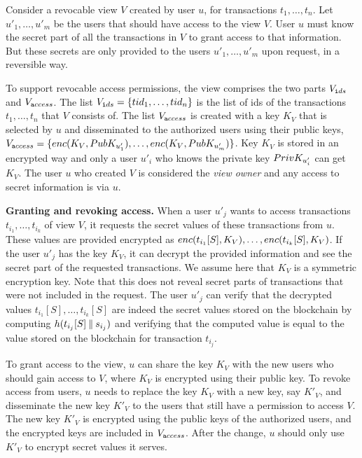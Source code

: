 Consider a revocable view $V$ created by user $u$, for transactions $t_1,\ldots, t_n$. Let $u'_1,\ldots, u'_m$ be the users that should have access to the view $V$. User $u$ must know the secret part of all the transactions in $V$ to grant access to that information. But these secrets are only provided to the users $u'_1,\ldots, u'_m$ upon request, in a reversible way. 

To support revocable access permissions, the view comprises the two parts $V_{\texttt ids\/}$ and $V_{\texttt access\/}$. The list $V_{\texttt ids\/} = \{ {tid\/}_{1}, \ldots, {tid\/}_{n}\}$ is the list of ids of the transactions $t_1,\ldots, t_n$ that $V$ consists of. The list $V_{\texttt access\/}$ is created with a key $K_V$ that is selected by $u$ and disseminated to the authorized users using their public keys, $V_{\texttt access\/} = \{enc\/(K_V, PubK_{u'_1}), \ldots, enc\/(K_V, PubK_{u'_m})\}$. Key $K_V$ is stored in an encrypted way and only a user $u'_i$ who knows the private key $PrivK_{u'_i}$ can get $K_V$. 
The user $u$ who created $V$ is considered the {\em view owner\/} and any access to secret information is via $u$. 

\medskip
\noindent
\textbf{Granting and revoking access.}
When a user $u'_j$ wants to access transactions $t_{i_1}, \ldots, t_{i_k}$ of view $V$, it requests the secret values of these transactions from $u$. These values are provided encrypted as $enc\/(t_{i_1}[S], K_V), \ldots, enc\/(t_{i_k}[S], K_V)$. If the user 
$u'_j$ has the key $K_V$, it can decrypt the provided information and see the secret part of the requested transactions. We assume here that $K_V$ is a symmetric encryption key. Note that this does not reveal secret parts of transactions that were not included in the request. The user $u'_j$ can verify that the decrypted values  $t_{i_1}[S], \ldots, t_{i_k}[S]$ are indeed the secret values stored on the blockchain by computing $h(t_{i_j}[S]\mathbin\Vert s_{i_j})$ and verifying that the computed value is equal to the value stored on the blockchain for transaction $t_{i_j}$.  

To grant access to the view, $u$ can share the key $K_V$ with the new users who should gain access to $V$, where $K_V$ is encrypted using their public key.
To revoke access from users, $u$ needs to replace the key $K_V$ with a new key, say $K'_V$, and disseminate the new key $K'_V$ to the users that still have a permission to access $V$. The new key $K'_V$ is encrypted using the public keys of the authorized users, and the encrypted keys are included in $V_{\texttt access\/}$. After the change, $u$ should only use $K'_V$ to encrypt secret values it serves.   


